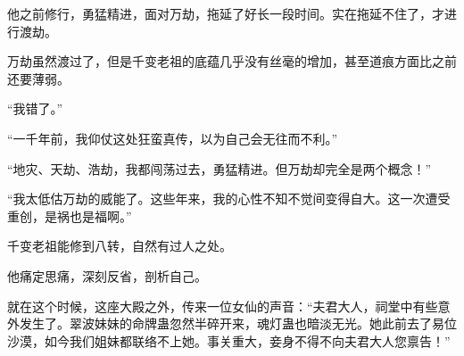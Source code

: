 \begin{this_body}
他之前修行，勇猛精进，面对万劫，拖延了好长一段时间。实在拖延不住了，才进行渡劫。

万劫虽然渡过了，但是千变老祖的底蕴几乎没有丝毫的增加，甚至道痕方面比之前还要薄弱。

“我错了。”

“一千年前，我仰仗这处狂蛮真传，以为自己会无往而不利。”

“地灾、天劫、浩劫，我都闯荡过去，勇猛精进。但万劫却完全是两个概念！”

“我太低估万劫的威能了。这些年来，我的心性不知不觉间变得自大。这一次遭受重创，是祸也是福啊。”

千变老祖能修到八转，自然有过人之处。

他痛定思痛，深刻反省，剖析自己。

就在这个时候，这座大殿之外，传来一位女仙的声音：“夫君大人，祠堂中有些意外发生了。翠波妹妹的命牌蛊忽然半碎开来，魂灯蛊也暗淡无光。她此前去了易位沙漠，如今我们姐妹都联络不上她。事关重大，妾身不得不向夫君大人您禀告！”

\end{this_body}

